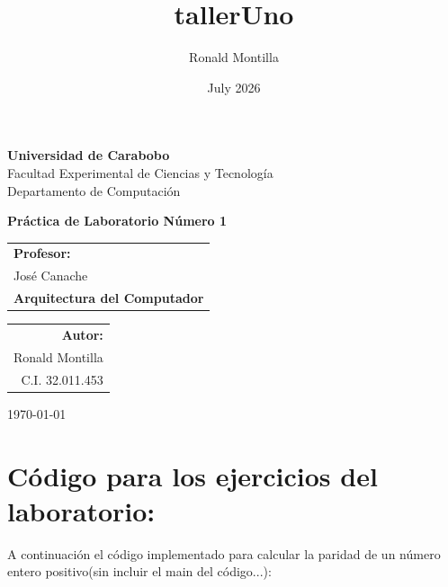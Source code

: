 \documentclass[12pt, a4paper]{article}
\title{tallerUno}
\author{Ronald Montilla}
\date{July 2026}
\begin{document}
\begin{titlepage}
    \centering %

    {\bfseries\LARGE Universidad de Carabobo} \\[0.4cm]
    {\LARGE Facultad Experimental de Ciencias y Tecnología} \\[0.2cm]
    {\LARGE Departamento de Computación} \\[1.5cm]
    

    
    \vfill

    {\bfseries\Huge Práctica de Laboratorio Número 1} \\[0.5cm]
    
    \vfill
    
    \vfill
    \begin{tabular}[t]{l}
        \large\textbf{Profesor:} \\
        \large José Canache \\
        \large\textbf{Arquitectura del Computador}
    \end{tabular}
    \hfill
    \begin{tabular}[t]{r}
        \large\textbf{Autor:} \\
        \large Ronald Montilla \\
        \large C.I. 32.011.453
    \end{tabular}

    {\today}
    
\end{titlepage}

\newpage 

\tableofcontents

\newpage

\section{Código para los ejercicios del laboratorio: }
    A continuación el código implementado para calcular la paridad de un número entero positivo(sin incluir el main del código...):
\end{document}
